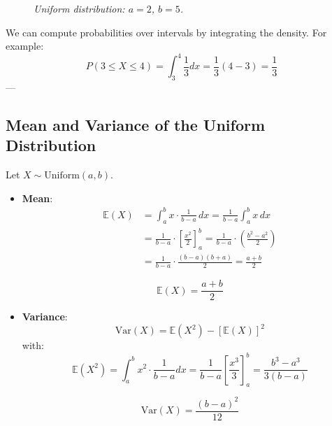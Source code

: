 \documentclass[twoside]{book}
\begin{document}
\begin{figure}[H]
\begin{center}
\caption{\textit{Uniform distribution: $a = 2$, $b = 5$.}}
\end{center}
\end{figure}

We can compute probabilities over intervals by integrating the density. For example:
\[
P(3 \le X \le 4) = \int_{3}^{4} \frac{1}{3} dx = \frac{1}{3}(4 - 3) = \frac{1}{3}
\]
---

\subsection{Mean and Variance of the Uniform Distribution}

Let $X \sim \text{Uniform}(a, b)$.

\begin{itemize}
    \item \textbf{Mean}:
\begin{align*}
\mathbb{E}(X) &= \int_a^b x \cdot \frac{1}{b - a} \, dx
= \frac{1}{b - a} \int_a^b x \, dx \\
&= \frac{1}{b - a} \cdot \left[ \frac{x^2}{2} \right]_a^b
= \frac{1}{b - a} \cdot \left( \frac{b^2 - a^2}{2} \right) \\
&= \frac{1}{b - a} \cdot \frac{(b - a)(b + a)}{2}
= \frac{a + b}{2}
\end{align*}

    \begin{textbox}
    \[
    \mathbb{E}(X) = \frac{a + b}{2}
    \]
    \end{textbox}

    \item \textbf{Variance}:
    \[
    \text{Var}(X) = \mathbb{E}(X^2) - [\mathbb{E}(X)]^2
    \]
    with:
    \[
    \mathbb{E}(X^2) = \int_a^b x^2 \cdot \frac{1}{b - a} dx = \frac{1}{b - a} \left[\dfrac{x^3}{3}\right]_a^b= \frac{b^3 - a^3}{3(b - a)}
    \]
    \begin{textbox}
    \[
    \text{Var}(X) = \frac{(b - a)^2}{12}
    \]
    \end{textbox}
\end{itemize}
\end{document}
